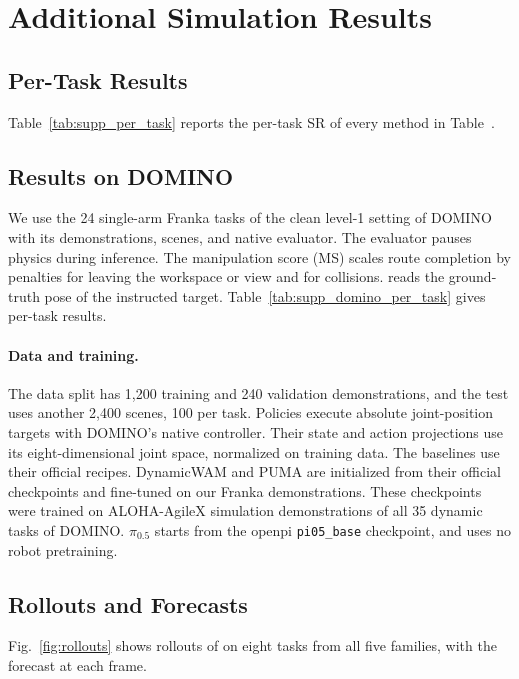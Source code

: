 \section{Additional Simulation Results}
\label{app:results}

\subsection{Per-Task Results}
\label{app:per_task}
Table~\ref{tab:supp_per_task} reports the per-task SR of every method in Table~.

\subsection{Results on DOMINO}
\label{app:external}
We use the 24 single-arm Franka tasks of the clean level-1 setting of DOMINO
\cite{domino} with its demonstrations, scenes, and native evaluator. The evaluator pauses
physics during inference. The manipulation score (MS) scales route completion by
penalties for leaving the workspace or view and for collisions. \ours reads the ground-truth pose of the instructed target.
Table~\ref{tab:supp_domino_per_task} gives per-task results.

\paragraph{Data and training.}
The data split has 1{,}200 training and 240 validation demonstrations, and the test uses
another 2{,}400 scenes, 100 per task. Policies execute absolute joint-position targets
with DOMINO's native controller. Their state and action projections use its
eight-dimensional joint space, normalized on training data. The baselines use their official recipes. DynamicWAM and PUMA are initialized from
their official checkpoints and fine-tuned on our Franka demonstrations. These
checkpoints were trained on ALOHA-AgileX simulation demonstrations of all 35 dynamic
tasks of DOMINO. $\pi_{0.5}$ starts from the openpi \texttt{pi05\_base} checkpoint, and \ours uses no robot pretraining.

\subsection{Rollouts and Forecasts}
\label{app:prediction}
Fig.~\ref{fig:rollouts} shows rollouts of \ours on eight tasks from all five families, with the forecast at each frame.
